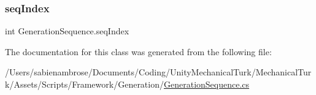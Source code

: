 \subsubsection{\texorpdfstring{seq\+Index}{seqIndex}}
{\footnotesize\ttfamily int Generation\+Sequence.\+seq\+Index}



The documentation for this class was generated from the following file\+:\begin{DoxyCompactItemize}
\item 
/\+Users/sabienambrose/\+Documents/\+Coding/\+Unity\+Mechanical\+Turk/\+Mechanical\+Turk/\+Assets/\+Scripts/\+Framework/\+Generation/\mbox{\hyperlink{_generation_sequence_8cs}{Generation\+Sequence.\+cs}}\end{DoxyCompactItemize}
